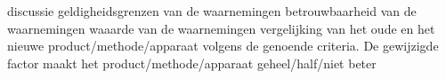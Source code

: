 
discussie
geldigheidsgrenzen van de waarnemingen
betrouwbaarheid van de waarnemingen
waaarde van de waarnemingen
vergelijking van het oude en het nieuwe product/methode/apparaat volgens de genoende criteria. De gewijzigde factor maakt het product/methode/apparaat geheel/half/niet beter
